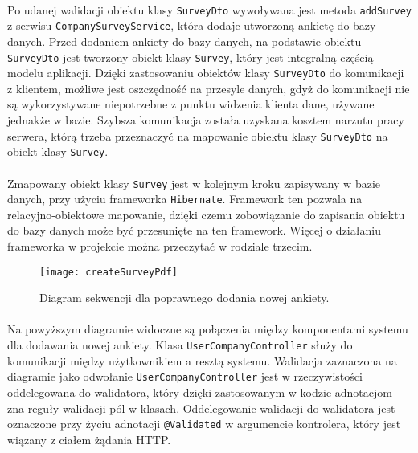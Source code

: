 \paragraph{}
Po udanej walidacji obiektu klasy \texttt{SurveyDto} wywoływana jest metoda \texttt{addSurvey} z serwisu \texttt{Company\-Survey\-Service}, która dodaje utworzoną ankietę do bazy danych. Przed dodaniem ankiety do bazy danych, na podstawie obiektu \texttt{SurveyDto} jest tworzony obiekt klasy \texttt{Survey}, który jest integralną częścią modelu aplikacji. Dzięki zastosowaniu obiektów klasy \texttt{SurveyDto} do komunikacji z klientem, możliwe jest oszczędność na przesyle danych, gdyż do komunikacji nie są wykorzystywane niepotrzebne z punktu widzenia klienta dane, używane jednakże w bazie. Szybsza komunikacja została uzyskana kosztem narzutu pracy serwera, którą trzeba przeznaczyć na mapowanie obiektu klasy \texttt{SurveyDto} na obiekt klasy \texttt{Survey}.

\paragraph{}
Zmapowany obiekt klasy \texttt{Survey} jest w kolejnym kroku zapisywany w bazie danych, przy użyciu frameworka \texttt{Hibernate}. Framework ten pozwala na relacyjno-obiektowe mapowanie, dzięki czemu zobowiązanie do zapisania obiektu do bazy danych może być przesunięte na ten framework. Więcej o działaniu frameworka w projekcie można przeczytać w rodziale trzecim.

\begin{figure}[h]
\centering
\texttt{[image: createSurveyPdf]}
\caption{Diagram sekwencji dla poprawnego dodania nowej ankiety.}
\end{figure}

\paragraph{}
Na powyższym diagramie widoczne są połączenia między komponentami systemu dla dodawania nowej ankiety. Klasa \texttt{UserCompanyController} służy do komunikacji między użytkownikiem a resztą systemu. Walidacja zaznaczona na diagramie jako odwołanie \texttt{UserCompanyController} jest w rzeczywistości oddelegowana do walidatora, który dzięki zastosowanym w kodzie adnotacjom zna reguły walidacji pól w klasach. Oddelegowanie walidacji do walidatora jest oznaczone przy życiu adnotacji \texttt{@Validated} w argumencie kontrolera, który jest wiązany z ciałem żądania HTTP.

